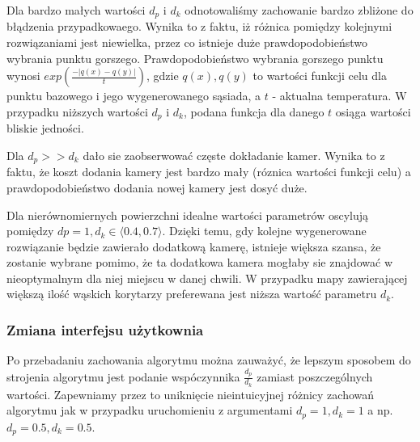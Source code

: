 \documentclass[12pt,a4paper]{article}
\begin{document}
Dla bardzo małych wartości $d_p$ i $d_k$ odnotowaliśmy zachowanie bardzo zbliżone do błądzenia przypadkowaego.
Wynika to z faktu, iż różnica pomiędzy kolejnymi rozwiązaniami jest niewielka, przez co istnieje duże prawdopodobieństwo wybrania punktu gorszego. Prawdopodobieństwo wybrania gorszego punktu wynosi
$exp(\frac{-|q(x)-q(y)|}{t})$, gdzie $q(x), q(y)$ to wartości funkcji celu dla punktu bazowego i jego wygenerowanego sąsiada, a $t$ - aktualna temperatura. W przypadku niższych wartości $d_p$ i $d_k$, podana funkcja dla danego $t$ osiąga
wartości bliskie jedności.
\begin{figure}[H]
\begin{floatrow}
       }
       \ffigbox[\FBwidth]{\caption{SlimMap, $d_p=1$, $d_k=0.1$, $skala=5$}\label{fig-10}}{%
         \texttt{[image: \{slimMap\_1\_0.1\_5]}.png}
       }
       \end{floatrow}
\end{figure}
Dla $d_p >> d_k$ dało sie zaobserwować częste dokładanie kamer. Wynika to z faktu, że koszt dodania kamery jest bardzo mały (róznica wartości funkcji celu) a prawdopodobieństwo dodania nowej kamery jest dosyć duże.

\begin{figure}[H]
\begin{floatrow}
       }
       \ffigbox[\FBwidth]{\caption{SlimMap, $d_p=1$, $d_k=0.4$, $skala=5$}\label{fig-12}}{%
         \texttt{[image: \{slimMap\_1\_0.4\_5]}.png}
       }
       \end{floatrow}
\end{figure}
Dla nierównomiernych powierzchni idealne wartości parametrów oscylują pomiędzy $dp=1, d_k\in \langle 0.4, 0.7 \rangle $.
Dzięki temu, gdy kolejne wygenerowane rozwiązanie będzie zawierało dodatkową kamerę, istnieje większa szansa,
że zostanie wybrane pomimo, że ta dodatkowa kamera mogłaby sie znajdować w nieoptymalnym dla niej miejscu w danej chwili.
W przypadku mapy zawierającej większą ilość wąskich korytarzy preferewana jest niższa wartość parametru $d_k$.


\newpage
\subsubsection{Zmiana interfejsu użytkownia}
Po przebadaniu zachowania algorytmu można zauważyć, że lepszym sposobem do strojenia algorytmu jest podanie
wspóczynnika $\frac{d_p}{d_k}$ zamiast poszczególnych wartości. Zapewniamy przez to uniknięcie nieintuicyjnej
różnicy zachowań algorytmu jak w przypadku uruchomieniu z argumentami $d_p=1, d_k=1$ a np. $d_p=0.5, d_k=0.5$.
\end{document}
